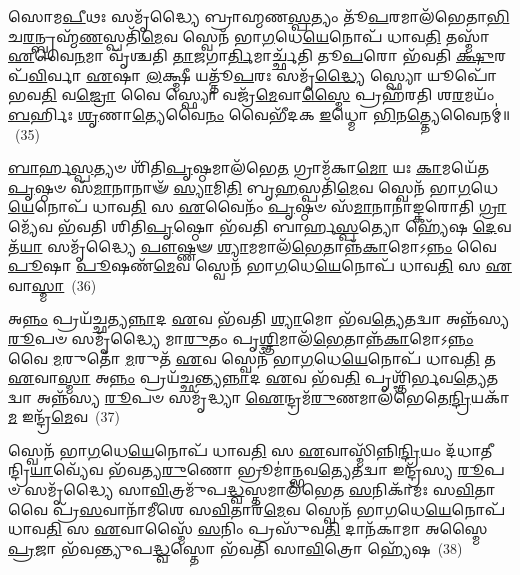 𑌸𑍋𑌮\-\ul{𑌪𑍀}\-𑌥𑌃 𑌸𑌮𑍃᳴𑌦𑍍𑌧𑍍𑌯𑍈 𑌬𑍍𑌰𑌾𑌹𑍍𑌮𑌣\-\ul{𑌸𑍍𑌪}\-𑌤𑍍𑌯𑌂 𑌤𑍂᳴\-\ul{𑌪}\-𑌰𑌮𑌾𑌲᳴𑌭𑍇𑌤𑌾\-\ul{𑌭𑌿}\-\-𑌚\-\ul{𑌰}\-𑌨𑍍𑌬𑍍𑌰𑌹𑍍𑌮᳴\-\ul{𑌣}\-𑌸𑍍𑌪𑌤𑌿᳴\-\ul{𑌮𑍇}\-𑌵 𑌸𑍍𑌵𑍇𑌨᳴ 𑌭𑌾\-\ul{𑌗}\-𑌧𑍇\-\ul{𑌯𑍇}\-𑌨𑍋𑌪᳴ 𑌧𑌾𑌵\-\ul{𑌤𑌿} 𑌤𑌸𑍍𑌮𑌾᳴ \ul{𑌏}\-𑌵𑍈\-\ul{𑌨}\-𑌮𑌾 𑌵𑍃᳴𑌶𑍍𑌚𑌤𑌿 \ul{𑌤𑌾}\-𑌜𑌗𑌾\-\ul{𑌰𑍍𑌤𑌿}\-𑌮𑌾𑌰𑍍𑌚𑍍𑌛᳴𑌤𑌿 𑌤𑍂\-\ul{𑌪}\-𑌰𑍋 𑌭᳴𑌵𑌤𑌿 \ul{𑌕𑍍𑌷𑍁}\-𑌰𑌪᳴\-\ul{𑌵𑌿}\-𑌰𑍍𑌵𑌾 \ul{𑌏}\-𑌷𑌾 \ul{𑌲}\-𑌕𑍍𑌷𑍍𑌮𑍀 𑌯𑌤𑍍𑌤𑍂᳴\-\ul{𑌪}\-𑌰𑌃 𑌸𑌮𑍃᳴\-\ul{𑌦𑍍𑌧𑍍𑌯𑍈} 𑌸𑍍𑌫𑍍𑌯𑍋 𑌯𑍂𑌪𑍋᳴ 𑌭𑌵\-\ul{𑌤𑌿} 𑌵\-\ul{𑌜𑍍𑌰𑍋} 𑌵𑍈 𑌸𑍍𑌫𑍍𑌯𑍋 𑌵𑌜𑍍𑌰᳴\-\ul{𑌮𑍇}\-𑌵𑌾\-\ul{𑌸𑍍𑌮𑍈} 𑌪𑍍𑌰𑌹᳴𑌰𑌤𑌿 𑌶\-\ul{𑌰}\-𑌮𑌯𑌂᳴ \ul{𑌬}\-𑌰𑍍\mbox{}𑌹𑌿𑌃 \ul{𑌶𑍃}\-𑌣𑌾\-\ul{𑌤𑍍𑌯𑍇}\-𑌵𑍈\-\ul{𑌨𑌂} 𑌵𑍈𑌭𑍀᳴𑌦𑌕 \ul{𑌇}\-𑌧𑍍𑌮𑍋 \ul{𑌭𑌿}\-𑌨\-\ul{𑌤𑍍𑌤𑍍𑌯𑍇}\-𑌵𑍈𑌨𑌮𑍍॑॥~(35)

{\anuvakamend[{\-\ul{𑌭}\-\-\ul{𑌵}\-\-\ul{𑌤𑍍𑌯𑍁}\-\-\ul{𑌨𑍍𑌨}\-𑌤𑌃 \ul{𑌪}\-𑌶𑌵𑍋᳴ 𑌜𑌨𑌯𑌨𑍍𑌤𑌿 \ul{𑌵𑌿}\-𑌨𑍍𑌦𑌤𑍇᳴\-𑌽𑌭\-\ul{𑌵}\-𑌥𑍍𑌸𑌨𑍍𑌨𑍈𑌤\-\ul{𑌸𑍍𑌯𑍇}\-𑌦𑍍𑌧𑍍𑌮𑌸𑍍𑌤𑍍𑌰𑍀𑌣𑌿᳴ 𑌚}]}%

\-\ul{𑌬𑌾}\-𑌰𑍍\mbox{}\-\ul{𑌹}\-\-\ul{𑌸𑍍𑌪}\-𑌤𑍍𑌯𑍞 𑌶𑌿᳴𑌤𑌿\-\ul{𑌪𑍃}\-𑌷𑍍𑌠𑌮𑌾\-𑌲᳴𑌭𑍇\-\ul{𑌤} 𑌗𑍍𑌰𑌾𑌮᳴𑌕𑌾\-\ul{𑌮𑍋} 𑌯𑌃 \ul{𑌕𑌾}\-𑌮𑌯𑍇᳴𑌤 \ul{𑌪𑍃}\-𑌷𑍍𑌠𑍞 𑌸᳴\-\ul{𑌮𑌾}\-𑌨𑌾𑌨𑌾𑍟᳴ \ul{𑌸𑍍𑌯𑌾}\-𑌮𑌿\-\ul{𑌤𑌿} 𑌬𑍃\-\ul{𑌹}\-𑌸𑍍𑌪𑌤𑌿᳴\-\ul{𑌮𑍇}\-𑌵 𑌸𑍍𑌵𑍇𑌨᳴ 𑌭𑌾\-\ul{𑌗}\-𑌧𑍇\-\ul{𑌯𑍇}\-𑌨𑍋𑌪᳴ 𑌧𑌾𑌵\-\ul{𑌤𑌿} 𑌸 \ul{𑌏}\-𑌵𑍈𑌨𑌂᳴ \ul{𑌪𑍃}\-𑌷𑍍𑌠𑍞 𑌸᳴\-\ul{𑌮𑌾}\-𑌨𑌾𑌨𑌾॑𑌙𑍍𑌕𑌰𑍋𑌤𑌿 \ul{𑌗𑍍𑌰𑌾}\-𑌮𑍍𑌯𑍇᳴𑌵 𑌭᳴𑌵𑌤𑌿 𑌶𑌿𑌤𑌿\-\ul{𑌪𑍃}\-𑌷𑍍𑌠𑍋 𑌭᳴𑌵𑌤𑌿 𑌬𑌾𑌰𑍍\mbox{}𑌹\-\ul{𑌸𑍍𑌪}\-𑌤𑍍𑌯𑍋 𑌹𑍍𑌯𑍇᳴𑌷 \ul{𑌦𑍇}\-𑌵𑌤᳴\-\ul{𑌯𑌾} 𑌸𑌮𑍃᳴𑌦𑍍𑌧𑍍𑌯𑍈 \ul{𑌪𑍗}\-𑌷𑍍𑌣𑍟 \ul{𑌶𑍍𑌯𑌾}\-𑌮𑌮𑌾𑌲᳴\-\ul{𑌭𑍇}\-𑌤𑌾𑌨𑍍𑌨᳴\-\ul{𑌕𑌾}\-𑌮𑍋\-𑌽\-\ul{𑌨𑍍𑌨𑌂} 𑌵𑍈 \ul{𑌪𑍂}\-𑌷𑌾 \ul{𑌪𑍂}\-𑌷𑌣᳴\-\ul{𑌮𑍇}\-𑌵 𑌸𑍍𑌵𑍇𑌨᳴ 𑌭𑌾\-\ul{𑌗}\-𑌧𑍇\-\ul{𑌯𑍇}\-𑌨𑍋𑌪᳴ 𑌧𑌾𑌵\-\ul{𑌤𑌿} 𑌸 \ul{𑌏}\-𑌵𑌾\-\ul{𑌸𑍍𑌮𑌾}\-~(36)

𑌅\-\ul{𑌨𑍍𑌨𑌂} 𑌪𑍍𑌰𑌯᳴𑌚𑍍𑌛𑌤𑍍𑌯\-\ul{𑌨𑍍𑌨𑌾}\-𑌦 \ul{𑌏}\-𑌵 𑌭᳴𑌵𑌤𑌿 \ul{𑌶𑍍𑌯𑌾}\-𑌮𑍋 𑌭᳴𑌵\-\ul{𑌤𑍍𑌯𑍇}\-𑌤𑌦𑍍𑌵𑌾 𑌅𑌨𑍍𑌨᳴𑌸𑍍𑌯 \ul{𑌰𑍂}\-𑌪𑍞 𑌸𑌮𑍃᳴𑌦𑍍𑌧𑍍𑌯𑍈 𑌮𑌾\-\ul{𑌰𑍁}\-𑌤𑌂 𑌪𑍃\-\ul{𑌶𑍍𑌞𑌿}\-𑌮𑌾𑌲᳴\-\ul{𑌭𑍇}\-𑌤𑌾𑌨𑍍𑌨᳴\-\ul{𑌕𑌾}\-𑌮𑍋\-𑌽\-\ul{𑌨𑍍𑌨𑌂} 𑌵𑍈 \ul{𑌮}\-𑌰𑍁𑌤𑍋᳴ \ul{𑌮}\-𑌰𑍁𑌤᳴ \ul{𑌏}\-𑌵 𑌸𑍍𑌵𑍇𑌨᳴ 𑌭𑌾\-\ul{𑌗}\-𑌧𑍇\-\ul{𑌯𑍇}\-𑌨𑍋𑌪᳴ 𑌧𑌾𑌵\-\ul{𑌤𑌿} 𑌤 \ul{𑌏}\-𑌵𑌾\-\ul{𑌸𑍍𑌮𑌾} 𑌅\-\ul{𑌨𑍍𑌨𑌂} 𑌪𑍍𑌰𑌯᳴𑌚𑍍𑌛𑌨𑍍𑌤𑍍𑌯\-\ul{𑌨𑍍𑌨𑌾}\-𑌦 \ul{𑌏}\-𑌵 𑌭᳴𑌵\-\ul{𑌤𑌿} 𑌪𑍃𑌶𑍍𑌞𑌿᳴𑌰𑍍𑌭𑌵\-\ul{𑌤𑍍𑌯𑍇}\-𑌤𑌦𑍍𑌵𑌾 𑌅𑌨𑍍𑌨᳴𑌸𑍍𑌯 \ul{𑌰𑍂}\-𑌪𑍞 𑌸𑌮𑍃᳴𑌦𑍍𑌧𑍍𑌯𑌾 \ul{𑌐}\-𑌨𑍍𑌦𑍍𑌰𑌮᳴\-\ul{𑌰𑍁}\-𑌣𑌮𑌾𑌲᳴𑌭𑍇𑌤𑍇\-\ul{𑌨𑍍𑌦𑍍𑌰𑌿}\-𑌯𑌕𑌾᳴\-\ul{𑌮} 𑌇𑌨𑍍𑌦𑍍𑌰᳴\-\ul{𑌮𑍇}\-𑌵~(37)

𑌸𑍍𑌵𑍇𑌨᳴ 𑌭𑌾\-\ul{𑌗}\-𑌧𑍇\-\ul{𑌯𑍇}\-𑌨𑍋𑌪᳴ 𑌧𑌾𑌵\-\ul{𑌤𑌿} 𑌸 \ul{𑌏}\-𑌵𑌾𑌸𑍍𑌮𑌿᳴𑌨𑍍𑌨𑌿\-\ul{𑌨𑍍𑌦𑍍𑌰𑌿}\-𑌯𑌂 𑌦᳴𑌧𑌾𑌤𑍀𑌨𑍍𑌦𑍍𑌰𑌿\-\ul{𑌯𑌾}\-𑌵𑍍𑌯𑍇᳴𑌵 𑌭᳴𑌵𑌤𑍍𑌯\-\ul{𑌰𑍁}\-𑌣𑍋 𑌭𑍍𑌰𑍂𑌮𑌾॑𑌨𑍍𑌭𑌵\-\ul{𑌤𑍍𑌯𑍇}\-𑌤𑌦𑍍𑌵𑌾 𑌇𑌨𑍍𑌦𑍍𑌰᳴𑌸𑍍𑌯 \ul{𑌰𑍂}\-𑌪𑍞 𑌸𑌮𑍃᳴𑌦𑍍𑌧𑍍𑌯𑍈 𑌸𑌾\-\ul{𑌵𑌿}\-𑌤𑍍𑌰𑌮𑍁᳴𑌪\-\-\ul{𑌦𑍍𑌧𑍍𑌵}\-𑌸𑍍𑌤𑌮𑌾𑌲᳴𑌭𑍇𑌤 \ul{𑌸}\-𑌨𑌿𑌕𑌾᳴𑌮𑌃 𑌸\-\ul{𑌵𑌿}\-𑌤𑌾 𑌵𑍈 𑌪𑍍𑌰᳴\-\ul{𑌸}\-𑌵𑌾𑌨𑌾᳴𑌮𑍀𑌶𑍇 𑌸\-\ul{𑌵𑌿}\-𑌤𑌾𑌰᳴\-\ul{𑌮𑍇}\-𑌵 𑌸𑍍𑌵𑍇𑌨᳴ 𑌭𑌾\-\ul{𑌗}\-𑌧𑍇\-\ul{𑌯𑍇}\-𑌨𑍋𑌪᳴ 𑌧𑌾𑌵\-\ul{𑌤𑌿} 𑌸 \ul{𑌏}\-𑌵𑌾𑌸𑍍𑌮𑍈᳴ \ul{𑌸}\-𑌨𑌿𑌂 𑌪𑍍𑌰𑌸𑍁᳴𑌵\-\ul{𑌤𑌿} 𑌦𑌾𑌨᳴𑌕𑌾𑌮𑌾 𑌅𑌸𑍍𑌮𑍈 \ul{𑌪𑍍𑌰}\-𑌜𑌾 𑌭᳴𑌵𑌨𑍍𑌤𑍍𑌯𑍁𑌪\-\ul{𑌦𑍍𑌧𑍍𑌵}\-𑌸𑍍𑌤𑍋 𑌭᳴𑌵𑌤𑌿 𑌸𑌾\-\ul{𑌵𑌿}\-𑌤𑍍𑌰𑍋 𑌹𑍍𑌯𑍇᳴𑌷~(38)

